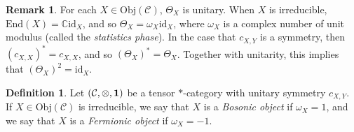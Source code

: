 \documentclass[12pt]{article}
\theoremstyle{definition}
\theoremstyle{definition}
\newtheorem{defn}[thm]{Definition}
\newtheorem{note}[thm]{Remark}
\theoremstyle{remark}
\newcommand{\Obj}{\mathrm{Obj}}
\def\2#1{{\mathcal #1}}
\def\7#1{{\mathbb #1}}
\def\1#1{{\bf #1}}
\def\om{\omega} \def\Om{\Omega} \def\dd{\partial} \def\D{\Delta}
\newcommand{\End}{\mathrm{End}}
\def\id{\mathrm{id}}
\begin{document}
\begin{note} For each $X\in \Obj (\2C )$, $\Theta _X$ is unitary.  When $X$ is
  irreducible, $\End (X)=\7C \id _X$, and so $\Theta _X =\om _X\id _X$, where $\om
  _X$ is a complex number of unit modulus (called the \emph{statistics phase}).  In
  the case that $c_{X,Y}$ is a symmetry, then $(c_{X,X})^*=c_{X,X}$, and so $(\Theta
  _X)^*=\Theta _X$.  Together with unitarity, this implies that $(\Theta _X)^2=\id
  _X$.
\end{note}

\begin{defn} Let $(\2C ,\otimes ,\11 )$ be a tensor $*$-category with unitary
  symmetry $c_{X,Y}$.  If $X\in \Obj (\2C )$ is irreducible, we say that $X$ is a
  \emph{Bosonic object} if $\om _X=1$, and we say that $X$ is a \emph{Fermionic
    object} if $\om _X=-1$.  \end{defn}
\end{document}
